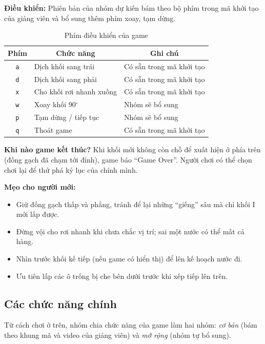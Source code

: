 \documentclass[a4paper]{article}
\begin{document}
\textbf{Điều khiển:} Phiên bản của nhóm dự kiến bám theo bộ phím trong mã khởi tạo của giảng viên và bổ sung thêm phím xoay, tạm dừng.

\begin{table}[H]
\centering

\begin{tabularx}{\linewidth}{|c|X|X|}
\hline
\textbf{Phím} & \multicolumn{1}{c|}{\textbf{Chức năng}} & \multicolumn{1}{c|}{\textbf{Ghi chú}} \\ \hline
\texttt{a} & Dịch khối sang trái & Có sẵn trong mã khởi tạo \\ \hline
\texttt{d} & Dịch khối sang phải & Có sẵn trong mã khởi tạo \\ \hline
\texttt{x} & Cho khối rơi nhanh xuống & Có sẵn trong mã khởi tạo \\ \hline
\texttt{w} & Xoay khối 90$^\circ$ & Nhóm sẽ bổ sung \\ \hline
\texttt{p} & Tạm dừng / tiếp tục & Nhóm sẽ bổ sung \\ \hline
\texttt{q} & Thoát game & Có sẵn trong mã khởi tạo \\ \hline
\end{tabularx}
\vspace{8pt}
\caption{Phím điều khiển của game}
\label{tab:dieukhien}
\end{table}

\textbf{Khi nào game kết thúc?} Khi khối mới không còn chỗ để xuất hiện ở phía trên (đống gạch đã chạm tới đỉnh), game báo ``Game Over''. Người chơi có thể chọn chơi lại để thử phá kỷ lục của chính mình.

\textbf{Mẹo cho người mới:}
\begin{itemize}
  \item Giữ đống gạch thấp và phẳng, tránh để lại những ``giếng'' sâu mà chỉ khối I mới lấp được.
  \item Đừng vội cho rơi nhanh khi chưa chắc vị trí; sai một nước có thể mất cả hàng.
  \item Nhìn trước khối kế tiếp (nếu game có hiển thị) để lên kế hoạch nước đi.
  \item Ưu tiên lấp các ô trống bị che bên dưới trước khi xếp tiếp lên trên.
\end{itemize}

\subsection{Các chức năng chính}\label{sec:chucnang}
Từ cách chơi ở trên, nhóm chia chức năng của game làm hai nhóm: \emph{cơ bản} (bám theo khung mã và video của giảng viên) và \emph{mở rộng} (nhóm tự bổ sung).
\end{document}
